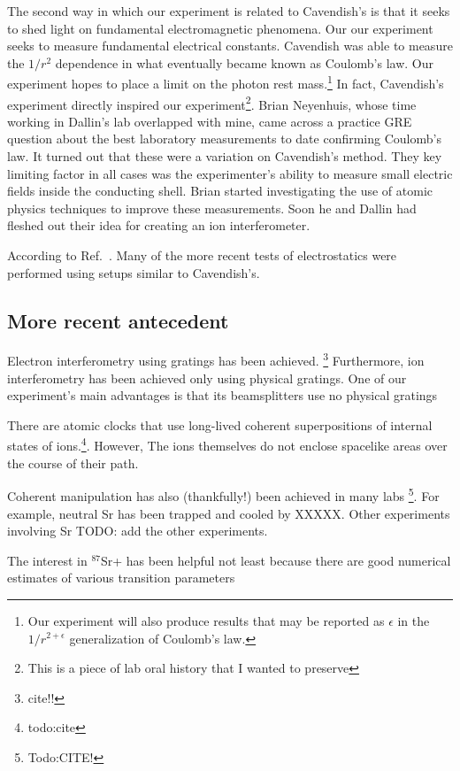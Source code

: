 The second way in which our experiment is related to Cavendish's is that it seeks to shed light on fundamental electromagnetic phenomena. Our our experiment seeks to measure fundamental electrical constants. Cavendish was able to measure the $1/r^2$ dependence in what eventually became known as Coulomb's law. Our experiment hopes to place a limit on the photon rest mass.\footnote{Our experiment will also produce results that may be reported as $\epsilon$ in the $1/r^{2+\epsilon}$ generalization of Coulomb's law.}
In fact, Cavendish's experiment directly inspired our experiment\footnote{This is a piece of lab oral history that I wanted to preserve}. Brian Neyenhuis, whose time working in Dallin's lab overlapped with mine, came across a practice GRE question about the best laboratory measurements to date confirming Coulomb's law. It turned out that these were a variation on Cavendish's method. They key limiting factor in all cases was the experimenter's ability to measure small electric fields inside the conducting shell. Brian started investigating the use of atomic physics techniques to improve these measurements. Soon he and Dallin had fleshed out their idea for creating an ion interferometer.  

According to Ref.\ \cite{jackson}. Many of the more recent tests of electrostatics were performed using setups similar to Cavendish's. 
\subsection{More recent antecedent}
Electron interferometry using gratings has been achieved. \footnote{cite!!} Furthermore, ion interferometry has been achieved only using physical gratings. One of our experiment's main advantages is that its beamsplitters use no physical gratings

There are atomic clocks that use long-lived coherent superpositions of internal states of ions.\footnote{todo:cite}. However, The ions themselves do not enclose spacelike areas over the course of their path.

Coherent manipulation has also (thankfully!) been achieved in many labs \footnote{Todo:CITE!}. For example, neutral Sr has been trapped and cooled by XXXXX. 
Other experiments involving Sr TODO: add the other experiments.

The interest in $^{87}$Sr+ has been helpful not least because there are good numerical estimates of various transition parameters \cite{safronovaTheory}


